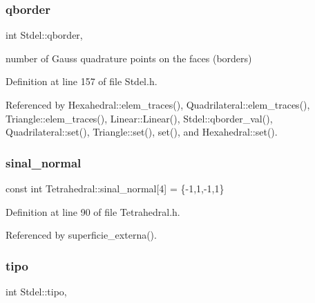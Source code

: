 \mbox{\label{classStdel_a63a106b928d211c71d5fec6449ef4d51}} 
\subsubsection{\texorpdfstring{qborder}{qborder}}
{\footnotesize\ttfamily int Stdel\+::qborder\hspace{0.3cm}{\ttfamily [protected]}, {\ttfamily [inherited]}}



number of Gauss quadrature points on the faces (borders) 



Definition at line 157 of file Stdel.\+h.



Referenced by Hexahedral\+::elem\+\_\+traces(), Quadrilateral\+::elem\+\_\+traces(), Triangle\+::elem\+\_\+traces(), Linear\+::\+Linear(), Stdel\+::qborder\+\_\+val(), Quadrilateral\+::set(), Triangle\+::set(), set(), and Hexahedral\+::set().

\mbox{\label{classTetrahedral_a10d388d6aa888355aff368370cf19cce}} 
\subsubsection{\texorpdfstring{sinal\+\_\+normal}{sinal\_normal}}
{\footnotesize\ttfamily const int Tetrahedral\+::sinal\+\_\+normal\mbox{[}4\mbox{]} = \{-\/1,1,-\/1,1\}\hspace{0.3cm}{\ttfamily [private]}}



Definition at line 90 of file Tetrahedral.\+h.



Referenced by superficie\+\_\+externa().

\mbox{\label{classStdel_a68f8781a42728758ccde39e15cd319ed}} 
\subsubsection{\texorpdfstring{tipo}{tipo}}
{\footnotesize\ttfamily int Stdel\+::tipo\hspace{0.3cm}{\ttfamily [protected]}, {\ttfamily [inherited]}}



